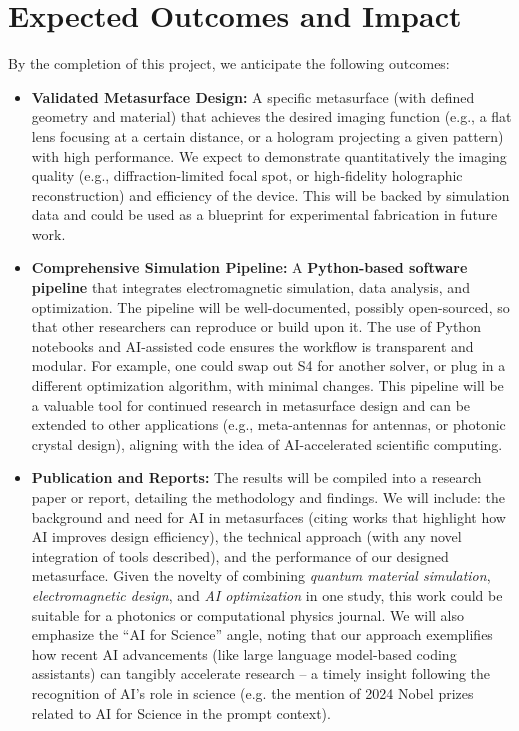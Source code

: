 \documentclass[11pt]{article}
\begin{document}
\section{Expected Outcomes and Impact}

By the completion of this project, we anticipate the following outcomes:

\begin{itemize}
  \item \textbf{Validated Metasurface Design:} A specific metasurface (with defined geometry and material) that achieves the desired imaging function (e.g., a flat lens focusing at a certain distance, or a hologram projecting a given pattern) with high performance. We expect to demonstrate quantitatively the imaging quality (e.g., diffraction-limited focal spot, or high-fidelity holographic reconstruction) and efficiency of the device. This will be backed by simulation data and could be used as a blueprint for experimental fabrication in future work.
  \item \textbf{Comprehensive Simulation Pipeline:} A \textbf{Python-based software pipeline} that integrates electromagnetic simulation, data analysis, and optimization. The pipeline will be well-documented, possibly open-sourced, so that other researchers can reproduce or build upon it. The use of Python notebooks and AI-assisted code ensures the workflow is transparent and modular. For example, one could swap out S4 for another solver, or plug in a different optimization algorithm, with minimal changes. This pipeline will be a valuable tool for continued research in metasurface design and can be extended to other applications (e.g., meta-antennas for antennas, or photonic crystal design), aligning with the idea of AI-accelerated scientific computing.
  \item \textbf{Publication and Reports:} The results will be compiled into a research paper or report, detailing the methodology and findings. We will include: the background and need for AI in metasurfaces (citing works that highlight how AI improves design efficiency), the technical approach (with any novel integration of tools described), and the performance of our designed metasurface. Given the novelty of combining \emph{quantum material simulation}, \emph{electromagnetic design}, and \emph{AI optimization} in one study, this work could be suitable for a photonics or computational physics journal. We will also emphasize the ``AI for Science'' angle, noting that our approach exemplifies how recent AI advancements (like large language model-based coding assistants) can tangibly accelerate research -- a timely insight following the recognition of AI's role in science (e.g. the mention of 2024 Nobel prizes related to AI for Science in the prompt context).

\end{itemize}
\end{document}

